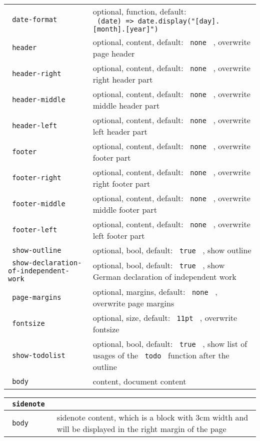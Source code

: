 \begin{longtable}[]{@{}ll@{}}
\texttt{\ date-format\ } & optional, function, default:
\texttt{\ (date)\ =\textgreater{}\ date.display("{[}day{]}.{[}month{]}.{[}year{]}")\ } \\
\texttt{\ header\ } & optional, content, default: \texttt{\ none\ } ,
overwrite page header \\
\texttt{\ header-right\ } & optional, content, default:
\texttt{\ none\ } , overwrite right header part \\
\texttt{\ header-middle\ } & optional, content, default:
\texttt{\ none\ } , overwrite middle header part \\
\texttt{\ header-left\ } & optional, content, default: \texttt{\ none\ }
, overwrite left header part \\
\texttt{\ footer\ } & optional, content, default: \texttt{\ none\ } ,
overwrite footer part \\
\texttt{\ footer-right\ } & optional, content, default:
\texttt{\ none\ } , overwrite right footer part \\
\texttt{\ footer-middle\ } & optional, content, default:
\texttt{\ none\ } , overwrite middle footer part \\
\texttt{\ footer-left\ } & optional, content, default: \texttt{\ none\ }
, overwrite left footer part \\
\texttt{\ show-outline\ } & optional, bool, default: \texttt{\ true\ } ,
show outline \\
\texttt{\ show-declaration-of-independent-work\ } & optional, bool,
default: \texttt{\ true\ } , show German declaration of independent
work \\
\texttt{\ page-margins\ } & optional, margins, default:
\texttt{\ none\ } , overwrite page margins \\
\texttt{\ fontsize\ } & optional, size, default: \texttt{\ 11pt\ } ,
overwrite fontsize \\
\texttt{\ show-todolist\ } & optional, bool, default: \texttt{\ true\ }
, show list of usages of the \texttt{\ todo\ } function after the
outline \\
\texttt{\ body\ } & content, document content \\
\end{longtable}

\begin{longtable}[]{@{}ll@{}}
\toprule\noalign{}
\texttt{\ sidenote\ } & \\
\midrule\noalign{}
\endhead
\bottomrule\noalign{}
\endlastfoot
\texttt{\ body\ } & sidenote content, which is a block with 3cm width
and will be displayed in the right margin of the page \\
\end{longtable}

